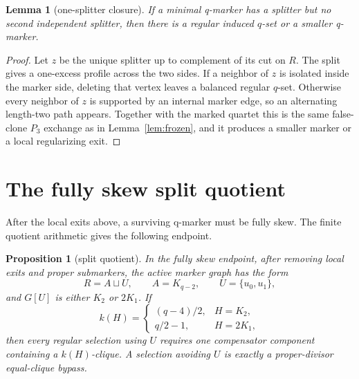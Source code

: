 \documentclass[11pt]{article}
\newtheorem{lemma}[theorem]{Lemma}
\newtheorem{proposition}[theorem]{Proposition}
\theoremstyle{remark}
\begin{document}
\begin{lemma}[one-splitter closure]\label{lem:one-splitter}
If a minimal q-marker has a splitter but no second independent splitter, then
there is a regular induced \(q\)-set or a smaller q-marker.
\end{lemma}

\begin{proof}
Let \(z\) be the unique splitter up to complement of its cut on \(R\).  The
split gives a one-excess profile across the two sides.  If a neighbor of \(z\)
is isolated inside the marker side, deleting that vertex leaves a balanced
regular \(q\)-set.  Otherwise every neighbor of \(z\) is supported by an
internal marker edge, so an alternating length-two path appears.  Together with
the marked quartet this is the same false-clone \(P_3\) exchange as in
Lemma~\ref{lem:frozen}, and it produces a smaller marker or a local regularizing
exit.
\end{proof}

\section{The fully skew split quotient}

After the local exits above, a surviving q-marker must be fully skew.  The
finite quotient arithmetic gives the following endpoint.

\begin{proposition}[split quotient]\label{prop:split-quotient}
In the fully skew endpoint, after removing local exits and proper submarkers,
the active marker graph has the form
\[
  R=A\sqcup U,\qquad A=K_{q-2},\qquad U=\{u_0,u_1\},
\]
and \(G[U]\) is either \(K_2\) or \(2K_1\).  If
\[
  k(H)=
  \begin{cases}
    (q-4)/2,&H=K_2,\\
    q/2-1,&H=2K_1,
  \end{cases}
\]
then every regular selection using \(U\) requires one compensator component
containing a \(k(H)\)-clique.  A selection avoiding \(U\) is exactly a
proper-divisor equal-clique bypass.
\end{proposition}
\end{document}
